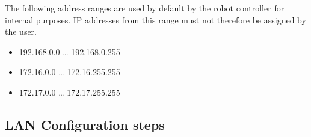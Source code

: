 \begin{mytheo}
   	The following address ranges are used by default by the
   robot controller for internal purposes. IP addresses from
   this range must not therefore be assigned by the user.
   \begin{itemize}
       \item 192.168.0.0 … 192.168.0.255
       \item 172.16.0.0 … 172.16.255.255
       \item 172.17.0.0 … 172.17.255.255
   \end{itemize}
\end{mytheo}

\subsection{LAN Configuration steps}
